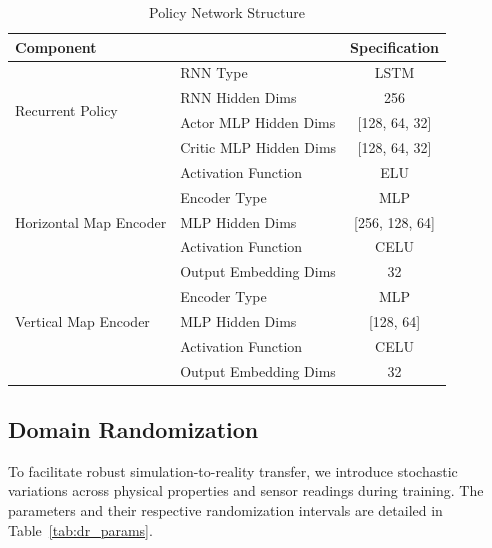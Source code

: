 \begin{table}[h!]
\centering
\caption{Policy Network Structure}
\label{tab:network_structure}
\begin{tabular}{l|l|c}
\toprule
\multicolumn{2}{l|}{\textbf{Component}} & \textbf{Specification} \\
\midrule
\multirow{4}{*}{Recurrent Policy} & RNN Type & LSTM \\
                           & RNN Hidden Dims & 256 \\
                           & Actor MLP Hidden Dims & [128, 64, 32] \\
                           & Critic MLP Hidden Dims & [128, 64, 32] \\
                           & Activation Function & ELU \\
\midrule
\multirow{3}{*}{Horizontal Map Encoder} & Encoder Type & MLP \\
                                 & MLP Hidden Dims & [256, 128, 64] \\
                                 & Activation Function & CELU \\
                                 & Output Embedding Dims & 32 \\
\midrule
\multirow{3}{*}{Vertical Map Encoder} & Encoder Type & MLP \\
                                 & MLP Hidden Dims & [128, 64] \\
                                 & Activation Function & CELU \\
                                 & Output Embedding Dims & 32 \\
\bottomrule
\end{tabular}
\end{table}

\subsection{Domain Randomization}
To facilitate robust simulation-to-reality transfer, we introduce stochastic variations across physical properties and sensor readings during training. The parameters and their respective randomization intervals are detailed in Table~\ref{tab:dr_params}.

